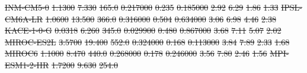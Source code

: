 \documentclass[gmd, manuscript]{copernicus}
\providecommand{\DIFdel}[1]{{\protect\color{red}\sout{#1}}}                      %
\providecommand{\DIFdelFL}[1]{\DIFdel{#1}} %
\begin{document}
\begin{table}[t]
{%
\DIFdelFL{INM-CM5-0       }%
\DIFdelFL{1.1300 }%
\DIFdelFL{7.330 }%
\DIFdelFL{165.0 }%
\DIFdelFL{0.217000 }%
\DIFdelFL{0.235 }%
\DIFdelFL{0.185000 }%
\DIFdelFL{2.92 }%
\DIFdelFL{6.29 }%
\DIFdelFL{1.86 }%
\DIFdelFL{1.33 }%
\DIFdelFL{IPSL-CM6A-LR    }%
\DIFdelFL{1.0600 }%
\DIFdelFL{13.500 }%
\DIFdelFL{366.0 }%
\DIFdelFL{0.316000 }%
\DIFdelFL{0.504 }%
\DIFdelFL{0.634000 }%
\DIFdelFL{3.06 }%
\DIFdelFL{6.98 }%
\DIFdelFL{4.46 }%
\DIFdelFL{2.38 }%
\DIFdelFL{KACE-1-0-G      }%
\DIFdelFL{0.0318 }%
\DIFdelFL{6.260 }%
\DIFdelFL{345.0 }%
\DIFdelFL{0.029900 }%
\DIFdelFL{0.480 }%
\DIFdelFL{0.867000 }%
\DIFdelFL{3.68 }%
\DIFdelFL{7.11 }%
\DIFdelFL{5.07 }%
\DIFdelFL{2.02 }%
\DIFdelFL{MIROC-ES2L      }%
\DIFdelFL{3.5700 }%
\DIFdelFL{19.400 }%
\DIFdelFL{552.0 }%
\DIFdelFL{0.324000 }%
\DIFdelFL{0.168 }%
\DIFdelFL{0.113000 }%
\DIFdelFL{3.84 }%
\DIFdelFL{7.89 }%
\DIFdelFL{2.33 }%
\DIFdelFL{1.68 }%
\DIFdelFL{MIROC6          }%
\DIFdelFL{1.1000 }%
\DIFdelFL{8.470 }%
\DIFdelFL{440.0 }%
\DIFdelFL{0.268000 }%
\DIFdelFL{0.178 }%
\DIFdelFL{0.246000 }%
\DIFdelFL{3.56 }%
\DIFdelFL{7.80 }%
\DIFdelFL{2.46 }%
\DIFdelFL{1.56 }%
\DIFdelFL{MPI-ESM1-2-HR   }%
\DIFdelFL{1.7200 }%
\DIFdelFL{9.630 }%
\DIFdelFL{254.0 }%
}
\end{table}
\end{document}
